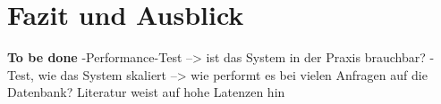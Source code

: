 
\chapter{Fazit und Ausblick}\label{ch:fazit}
\textbf{To be done}
-Performance-Test --> ist das System in der Praxis brauchbar?
-Test, wie das System skaliert --> wie performt es bei vielen Anfragen auf die Datenbank? Literatur weist auf hohe Latenzen hin